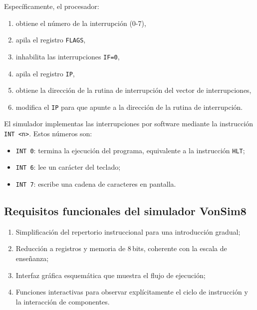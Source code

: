 \documentclass[12pt,oneside]{templates/unerthesis}
\providecommand{\tightlist}{%
  \setlength{\itemsep}{0pt}\setlength{\parskip}{0pt}}
\begin{document}
Específicamente, el procesador:

\begin{enumerate}
\def\labelenumi{\arabic{enumi}.}
\tightlist
\item
  obtiene el número de la interrupción (0-7),
\item
  apila el registro \texttt{FLAGS},
\item
  inhabilita las interrupciones \texttt{IF=0},
\item
  apila el registro \texttt{IP},
\item
  obtiene la dirección de la rutina de interrupción del vector de interrupciones,
\item
  modifica el \texttt{IP} para que apunte a la dirección de la rutina de interrupción.
\end{enumerate}

El simulador implementas las interrupciones por software mediante la instrucción \texttt{INT\ \textless{}n\textgreater{}}. Estos números son:

\begin{itemize}
\tightlist
\item
  \texttt{INT\ 0}: termina la ejecución del programa, equivalente a la instrucción \texttt{HLT};
\item
  \texttt{INT\ 6}: lee un carácter del teclado;
\item
  \texttt{INT\ 7}: escribe una cadena de caracteres en pantalla.
\end{itemize}

\hypertarget{requisitos-funcionales-del-simulador-vonsim8}{%
\subsection{Requisitos funcionales del simulador VonSim8}\label{requisitos-funcionales-del-simulador-vonsim8}}

\begin{enumerate}
\def\labelenumi{\arabic{enumi}.}
\item
  Simplificación del repertorio instruccional para una introducción gradual;
\item
  Reducción a registros y memoria de 8\,bits, coherente con la escala de enseñanza;
\item
  Interfaz gráfica esquemática que muestra el flujo de ejecución;
\item
  Funciones interactivas para observar explícitamente el ciclo de instrucción y la interacción de componentes.
\end{enumerate}
\end{document}
